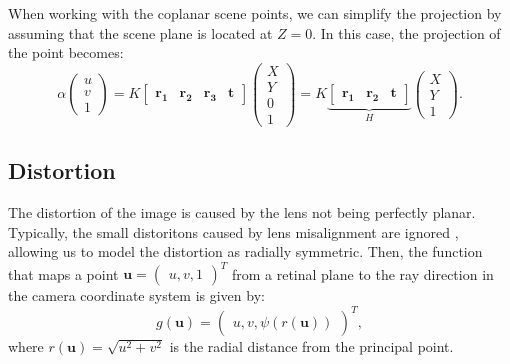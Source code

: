 When working with the coplanar scene points, we can simplify the projection
by assuming that the scene plane is located at \(Z = 0\). In this case, the
projection of the point becomes:
\begin{equation}
	\alpha \begin{pmatrix}
		u \\ v \\ 1
	\end{pmatrix} = K \begin{bmatrix}
		\mathbf{r_1} & \mathbf{r_2} & \mathbf{r_3} & \mathbf{t}
	\end{bmatrix} \begin{pmatrix}
		X \\ Y \\ 0 \\ 1
	\end{pmatrix} = K \underbrace{\begin{bmatrix}
			\mathbf{r_1} & \mathbf{r_2} & \mathbf{t}
		\end{bmatrix}}_{H} \begin{pmatrix}
		X \\ Y \\ 1
	\end{pmatrix}.
\end{equation}

\subsection{Distortion}\label{sub:distortion}

The distortion of the image is caused by the lens not being perfectly planar.
Typically, the small distoritons caused by lens misalignment are ignored
, allowing us to model the distortion as radially symmetric.
Then, the function that maps a point \(\mathbf{u} = \begin{pmatrix}
	u, v, 1
\end{pmatrix}^{T}\) from a retinal plane to the
ray direction in the camera coordinate system is given by:
\begin{equation}
	g(\mathbf{u}) = \begin{pmatrix}
		u, v, \psi(r(\mathbf{u}))
	\end{pmatrix}^{T},
\end{equation}
where \(r(\mathbf{u}) = \sqrt{u^2 + v^2}\) is the radial distance from the
principal point.


